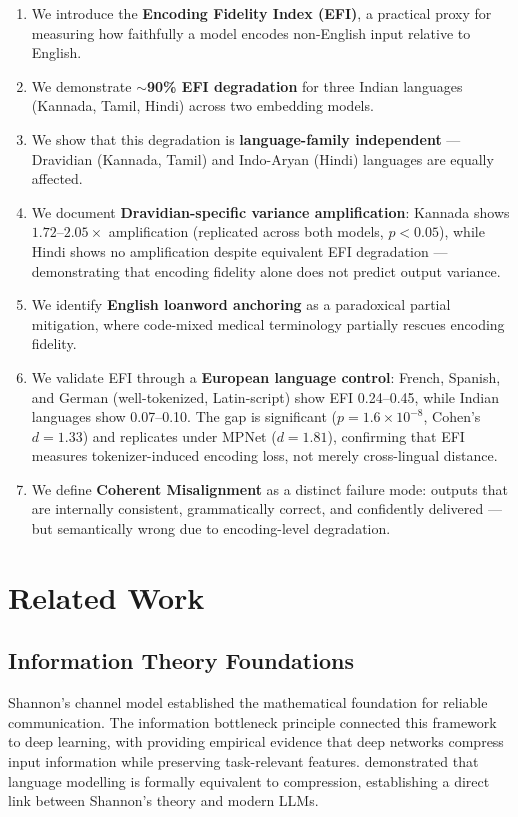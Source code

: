 \documentclass[11pt,a4paper]{article}
\begin{document}
\begin{enumerate}
    \item We introduce the \textbf{Encoding Fidelity Index (EFI)}, a practical proxy for measuring how faithfully a model encodes non-English input relative to English.
    \item We demonstrate \textbf{$\sim$90\% EFI degradation} for three Indian languages (Kannada, Tamil, Hindi) across two embedding models.
    \item We show that this degradation is \textbf{language-family independent} --- Dravidian (Kannada, Tamil) and Indo-Aryan (Hindi) languages are equally affected.
    \item We document \textbf{Dravidian-specific variance amplification}: Kannada shows $1.72$--$2.05\times$ amplification (replicated across both models, $p < 0.05$), while Hindi shows no amplification despite equivalent EFI degradation --- demonstrating that encoding fidelity alone does not predict output variance.
    \item We identify \textbf{English loanword anchoring} as a paradoxical partial mitigation, where code-mixed medical terminology partially rescues encoding fidelity.
    \item We validate EFI through a \textbf{European language control}: French, Spanish, and German (well-tokenized, Latin-script) show EFI 0.24--0.45, while Indian languages show 0.07--0.10. The gap is significant ($p = 1.6 \times 10^{-8}$, Cohen's $d = 1.33$) and replicates under MPNet ($d = 1.81$), confirming that EFI measures tokenizer-induced encoding loss, not merely cross-lingual distance.
    \item We define \textbf{Coherent Misalignment} as a distinct failure mode: outputs that are internally consistent, grammatically correct, and confidently delivered --- but semantically wrong due to encoding-level degradation.
\end{enumerate}

\section{Related Work}

\subsection{Information Theory Foundations}

Shannon's channel model \citep{shannon1948} established the mathematical foundation for reliable communication. The information bottleneck principle \citep{tishby2015} connected this framework to deep learning, with \citet{shwartzziv2017} providing empirical evidence that deep networks compress input information while preserving task-relevant features. \citet{deletang2024} demonstrated that language modelling is formally equivalent to compression, establishing a direct link between Shannon's theory and modern LLMs.
\end{document}
